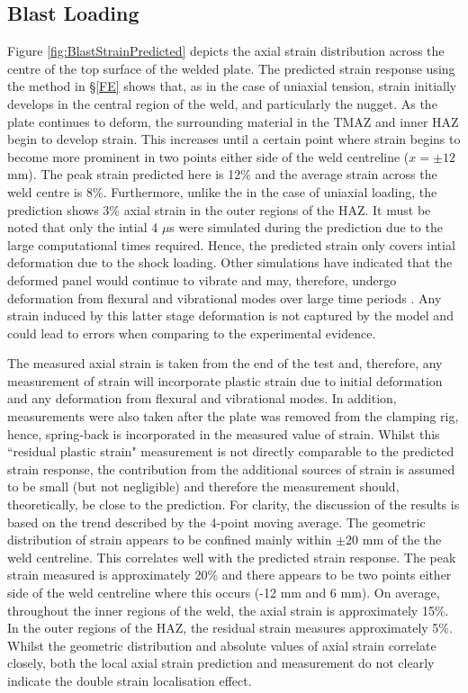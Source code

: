 \subsection{Blast Loading}
\label{RADBlastLoading}
Figure \ref{fig:BlastStrainPredicted} depicts the axial strain distribution across the centre of the top surface of the welded plate. The predicted strain response using the method in \S\ref{FE} shows that, as in the case of uniaxial tension, strain initially develops in the central region of the weld, and particularly the nugget. As the plate continues to deform, the surrounding material in the TMAZ and inner HAZ begin to develop strain. This increases until a certain point where strain begins to become more prominent in two points either side of the weld centreline ($x=\pm12$ mm). The peak strain predicted here is 12\% and the average strain across the weld centre is 8\%. Furthermore, unlike the in the case of uniaxial loading, the prediction shows 3\% axial strain in the outer regions of the HAZ. It must be noted that only the intial 4 $\mu$s were simulated during the prediction due to the large computational times required. Hence, the predicted strain only covers intial deformation due to the shock loading. Other simulations have indicated that the deformed panel would continue to vibrate and may, therefore, undergo deformation from flexural and vibrational modes over large time periods \cite{Ngo2007,Balden2005}. Any strain induced by this latter stage deformation is not captured by the model and could lead to errors when comparing to the experimental evidence. 

The measured axial strain is taken from the end of the test and, therefore, any measurement of strain will incorporate plastic strain due to initial deformation and any deformation from flexural and vibrational modes. In addition, measurements were also taken after the plate was removed from the clamping rig, hence, spring-back \cite{Zadpoor2009} is incorporated in the measured value of strain. Whilst this ``residual plastic strain" measurement is not directly comparable to the predicted strain response, the contribution from the additional sources of strain is assumed to be small (but not negligible) and therefore the measurement should, theoretically, be close to the prediction. For clarity, the discussion of the results is based on the trend described by the 4-point moving average. The geometric distribution of strain appears to be confined mainly within $\pm$20 mm  of the the weld centreline. This correlates well with the predicted strain response. The peak strain measured is approximately 20\% and there appears to be two points either side of the weld centreline where this occurs (-12 mm and 6 mm). On average, throughout the inner regions of the weld, the axial strain is approximately 15\%. In the outer regions of the HAZ, the residual strain measures approximately 5\%. Whilst the geometric distribution and absolute values of axial strain correlate closely, both the local axial strain prediction and measurement do not clearly indicate the double strain localisation effect. 

